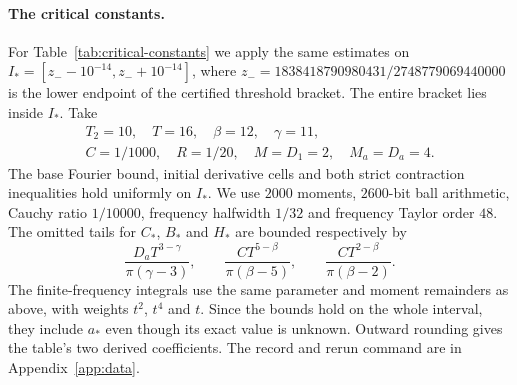 \paragraph{The critical constants.}
For Table~\ref{tab:critical-constants} we apply the same estimates on
$I_*=[z_--10^{-14},z_-+10^{-14}]$, where
$z_-=1838418790980431/2748779069440000$ is the lower endpoint of the
certified threshold bracket. The entire bracket lies inside $I_*$.
Take
\[
 \begin{gathered}
 T_2=10,\quad T=16,\quad\beta=12,\quad\gamma=11,\\
 C=1/1000,\quad R=1/20,\quad M=D_1=2,\quad M_a=D_a=4.
 \end{gathered}
\]
The base Fourier bound, initial derivative cells and both strict
contraction inequalities hold uniformly on $I_*$. We use $2000$ moments,
$2600$-bit ball arithmetic, Cauchy ratio $1/10000$, frequency halfwidth
$1/32$ and frequency Taylor order $48$.
The omitted tails for $C_*$, $B_*$ and $H_*$ are bounded respectively by
\[
 \frac{D_aT^{3-\gamma}}{\pi(\gamma-3)},\qquad
 \frac{CT^{5-\beta}}{\pi(\beta-5)},\qquad
 \frac{CT^{2-\beta}}{\pi(\beta-2)}.
\]
The finite-frequency integrals use the same parameter and moment
remainders as above, with weights $t^2$, $t^4$ and $t$.
Since the bounds hold on the whole interval, they include $a_*$
even though its exact value is unknown. Outward rounding gives the
table's two derived coefficients. The record and rerun command are
in Appendix~\ref{app:data}.
